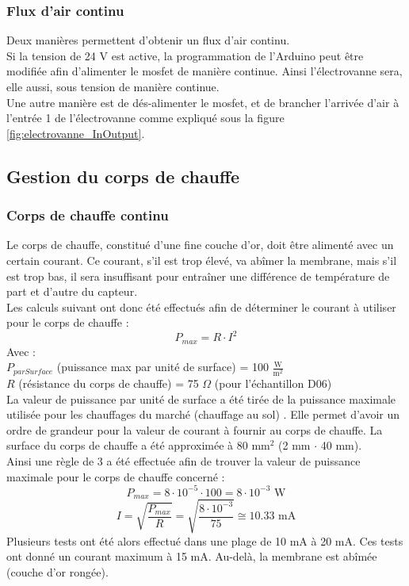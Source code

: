 \subsubsection{Flux d'air continu}
Deux manières permettent d'obtenir un flux d'air continu. \\

Si la tension de 24 V est active, la programmation de l'Arduino peut être modifiée afin d'alimenter le \gls{mosfet} de manière continue. 
Ainsi l'électrovanne sera, elle aussi, sous tension de manière continue. \\

Une autre manière est de dés-alimenter le \gls{mosfet}, et de brancher l'arrivée d'air à l'entrée 1 de l'électrovanne comme expliqué sous la 
figure \ref{fig:electrovanne_InOutput}. 

\subsection{Gestion du corps de chauffe}
\subsubsection{Corps de chauffe continu}
\label{chap:corps_de_chauffe}
Le corps de chauffe, constitué d'une fine couche d'or, doit être alimenté avec un certain courant. Ce courant, s'il est trop élevé, va abîmer la
membrane, mais s'il est trop bas, il sera insuffisant pour entraîner une différence de température de part et d'autre du capteur. \\

Les calculs suivant ont donc été effectués afin de déterminer le courant à utiliser pour le corps de chauffe :
\[P_{max} = R\cdot I^2\]
Avec :\\
$P_{parSurface}$ (puissance max par unité de surface) = 100 $\frac{\text{W}}{\text{m}^2}$\\
$R$ (résistance du corps de chauffe) = 75 $\Omega$ (pour l'échantillon D06)\\

La valeur de puissance par unité de surface a été tirée de la puissance maximale utilisée pour les chauffages du marché (chauffage au sol) 
\cite{noauthor_choisir_nodate}.
Elle permet d'avoir un ordre de grandeur pour la valeur de courant à fournir au corps de chauffe.
La surface du corps de chauffe a été approximée à 80 mm$^2$ (2 mm $\cdot$ 40 mm).\\
Ainsi une règle de 3 a été effectuée afin de trouver la valeur de puissance maximale pour le corps de chauffe concerné :
\[P_{max} = 8\cdot 10^{-5}\cdot 100 = 8\cdot 10^{-3} \text{ W}\]
\[I = \sqrt{\frac{P_{max}}{R}} = \sqrt{\frac{8\cdot 10^{-3}}{75}} \cong 10.33\text{ mA}\]
Plusieurs tests ont été alors effectué dans une plage de 10 mA à 20 mA. Ces tests ont donné un courant maximum à 15 mA. Au-delà, la membrane
est abîmée (couche d'or rongée).\\

